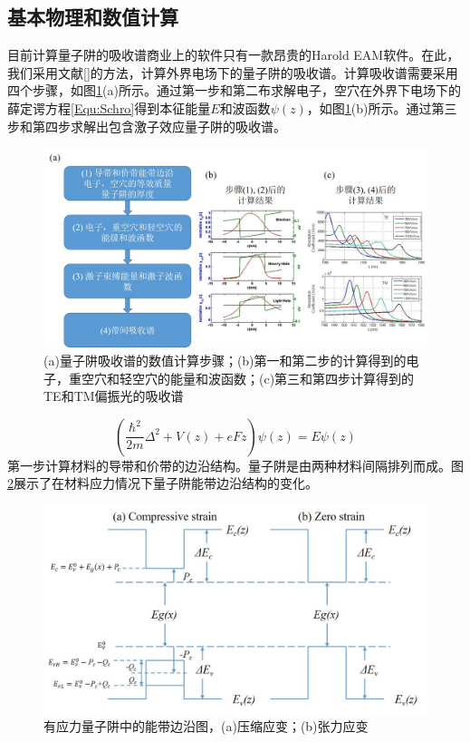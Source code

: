 \subsection{基本物理和数值计算}
目前计算量子阱的吸收谱商业上的软件只有一款昂贵的Harold EAM\cite{HarolEAM}软件。在此，我们采用文献[]的方法，计算外界电场下的量子阱的吸收谱。计算吸收谱需要采用四个步骤，如图\ref{fig_ch2_flow_chart}(a)所示。通过第一步和第二布求解电子，空穴在外界下电场下的薛定谔方程\ref{Equ:Schro}得到本征能量$E$和波函数$\psi(z)$，如图\ref{fig_ch2_flow_chart}(b)所示。通过第三步和第四步求解出包含激子效应量子阱的吸收谱。
\begin{figure}[htb]
	\centering
	\includegraphics[width=16cm]{./Pictures/fig_ch2_flow_chart.jpg}
	\caption{(a)量子阱吸收谱的数值计算步骤；(b)第一和第二步的计算得到的电子，重空穴和轻空穴的能量和波函数；(c)第三和第四步计算得到的TE和TM偏振光的吸收谱}
	\label{fig_ch2_flow_chart}
\end{figure}

\begin{equation}
\label{Equ:Schro}
(\frac{\hbar^2}{2m}\Delta^2+V(z)+eFz)\psi(z)=E\psi(z)
\end{equation}
第一步计算材料的导带和价带的边沿结构。量子阱是由两种材料间隔排列而成。图\ref{fig_ch2_band_diagram}展示了在材料应力情况下量子阱能带边沿结构的变化\cite{chuang1995physics}。

\begin{figure}[htb]
	\centering
	\includegraphics[width=14cm]{./Pictures/fig_ch2_band_diagram.jpg}
	\caption{有应力量子阱中的能带边沿图，(a)压缩应变；(b)张力应变}
	\label{fig_ch2_band_diagram}
\end{figure}

